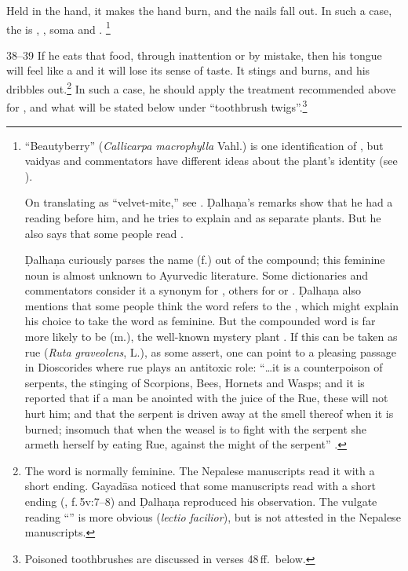 \begin{translation}
Held in the hand, it makes the hand burn, and the nails fall out. In such a case,
the  is , %
, %
soma and .%
\footnote{\label{beautyberry}“Beautyberry” (\emph{Callicarpa macrophylla} 
Vahl.) is one
identification of , but vaidyas and commentators have different ideas
about the plant's identity (see \cites[410]{sing-1972}[1:
334]{avs}[\#420]{nadk-1954}).  
\par 
On translating  as “velvet-mite,”
see \cite{lien-1978}. Ḍalhaṇa's remarks show that he had a reading
 before him, and he tries to explain  and  as
separate plants.  But he also says that some people read . 
\par
 Ḍalhaṇa
curiously parses the name  (f.) out of the compound; this feminine noun
is almost unknown to Ayurvedic literature.  Some dictionaries and commentators
consider it a synonym for , others for  or
.  Ḍalhaṇa also mentions that some people think the word refers to
the , which might explain his choice to take the word as
feminine.  But the compounded word is far more likely to be  (m.), the
well-known mystery plant \citep[see][76--78, 125]{wuja-2003}.  If this can be
taken as rue (\emph{Ruta graveolens}, L.), as some assert, one can point to a
pleasing passage in Dioscorides where rue plays an antitoxic role: “\ldots it is a
counterpoison of serpents, the stinging of Scorpions, Bees, Hornets and Wasps; and
it is reported that if a man be anointed with the juice of the Rue, these will not
hurt him; and that the serpent is driven away at the smell thereof when it is
burned; insomuch that when the weasel is to fight with the serpent she armeth
herself by eating Rue, against the might of the serpent” \parencites[cited 
from][262]{wren-1956}[not found in][]{osba-dios}.}
     
     \item [38--39] If he eats that food, through inattention or by mistake, then
his tongue will feel like a  and it will lose its sense
of taste. It stings and %
burns, and his \label{saliva} dribbles out.\footnote{The word
 is normally feminine.   The Nepalese manuscripts read it with a
short  ending.  Gayadāsa noticed that some manuscripts read 
with a short  ending (, f.\,5v:7--8) and 
Ḍalhaṇa
reproduced his observation.  The vulgate reading “” is
more obvious (\emph{lectio facilior}), but is not attested in the Nepalese
manuscripts.} In such a case, he should apply the treatment recommended above 
for
, and what will be stated below under “toothbrush
twigs”.\footnote{Poisoned toothbrushes are discussed in verses 48\,ff.\ below.}
     

\end{translation}
